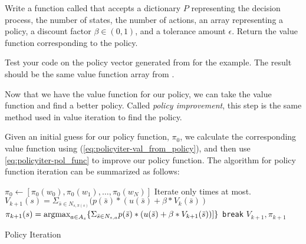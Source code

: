 \begin{problem}
\label{prob:policyiter-value3}
Write a function called  that accepts a dictionary $P$ representing the decision process, the number of states, the number of actions, an array representing a policy, a discount factor $\beta \in (0,1)$, and a tolerance amount $\epsilon$.
Return the value function corresponding to the policy.

Test your code on the policy vector generated from  for the example.
The result should be the same value function array from .
\end{problem}

Now that we have the value function for our policy, we can take the value function and find a better policy.
Called \emph{policy improvement}, this step is the same method used in value iteration to find the policy.

Given an initial guess for our policy function, $\pi_0$, we calculate the corresponding value function using (\ref{eq:policyiter-val_from_policy}), and then use \eqref{eq:policyiter-pol_func} to improve our policy function.
The algorithm for policy function iteration can be summarized as follows:


\begin{algorithm}[H]
\begin{algorithmic}[1]
    \State $\pi_0 \gets [\pi_0(w_0),\pi_0(w_1),\ldots,\pi_0(w_N)] $
        \Comment Iterate only  times at most.
            \State $V_{k+1}(s) =\Sigma_{\bar{s}\in N_{s,\pi(s)}}(p(\bar{s})*(u(\bar{s}) + \beta *V_{k}(\bar{s}))$
        \EndFor
            \State $\pi_{k+1}(s) =\mbox{argmax}_{a \in A_s} \{\Sigma_{\bar{s}\in N_{s,a}} p(\bar{s})*(u(\bar{s}) + \beta*V_{k+1}(\bar{s}))]\}$
        \EndFor
            \State \texttt{break}
        \EndIf
    \EndFor
    \State {} $V_{k+1}, \pi_{k+1}$
\EndProcedure
\end{algorithmic}
\caption{Policy Iteration}
\label{alg:PolicyIteration}
\end{algorithm}

